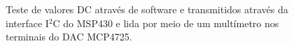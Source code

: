 \begin{figure}[!ht]
		 			\caption{Teste de valores DC através de software e transmitidos através da interface I$^2$C do MSP430 e lida por meio de um multímetro nos terminais do DAC MCP4725.}
				 \end{figure}
			 
